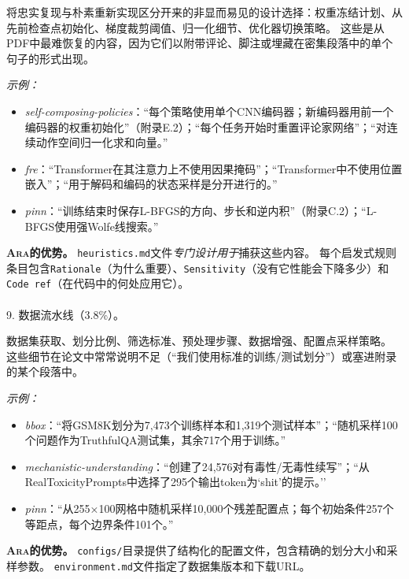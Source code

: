 \documentclass[
]{article}
\makeatletter
\let\oldparagraph\paragraph
\renewcommand{\paragraph}{
    \@ifstar
      \xxxParagraphStar
      \xxxParagraphNoStar
  }
\newcommand{\xxxParagraphStar}[1]{\oldparagraph*{#1}\mbox{}}
\newcommand{\xxxParagraphNoStar}[1]{\oldparagraph{#1}\mbox{}}
\newcommand{\passthrough}[1]{#1}
\providecommand{\tightlist}{%
  \setlength{\itemsep}{0pt}\setlength{\parskip}{0pt}}
\theoremstyle{definition}
\newcommand{\ara}{\textsc{Ara}}
\makeatother
\begin{document}
将忠实复现与朴素重新实现区分开来的非显而易见的设计选择：权重冻结计划、从先前检查点初始化、梯度裁剪阈值、归一化细节、优化器切换策略。
这些是从PDF中最难恢复的内容，因为它们以附带评论、脚注或埋藏在密集段落中的单个句子的形式出现。

\emph{示例：}

\begin{itemize}
\tightlist
\item
  \emph{self-composing-policies}：``每个策略使用单个CNN编码器；新编码器用前一个编码器的权重初始化''（附录E.2）；``每个任务开始时重置评论家网络''；``对连续动作空间归一化求和向量。''
\item
  \emph{fre}：``Transformer在其注意力上不使用因果掩码''；``Transformer中不使用位置嵌入''；``用于解码和编码的状态采样是分开进行的。''
\item
  \emph{pinn}：``训练结束时保存L-BFGS的方向、步长和逆内积''（附录C.2）；``L-BFGS使用强Wolfe线搜索。''
\end{itemize}

\textbf{\ara{}的优势。}
\passthrough{\lstinline!heuristics.md!}文件\emph{专门设计用于}捕获这些内容。
每个启发式规则条目包含\passthrough{\lstinline!Rationale!}（为什么重要）、\passthrough{\lstinline!Sensitivity!}（没有它性能会下降多少）和\passthrough{\lstinline!Code ref!}（在代码中的何处应用它）。

\paragraph{9.
数据流水线（3.8\%）。}\label{ux6570ux636eux6d41ux6c34ux7ebf3.8}

数据集获取、划分比例、筛选标准、预处理步骤、数据增强、配置点采样策略。
这些细节在论文中常常说明不足（``我们使用标准的训练/测试划分''）或塞进附录的某个段落中。

\emph{示例：}

\begin{itemize}
\tightlist
\item
  \emph{bbox}：``将GSM8K划分为7,473个训练样本和1,319个测试样本''；``随机采样100个问题作为TruthfulQA测试集，其余717个用于训练。''
\item
  \emph{mechanistic-understanding}：``创建了24,576对有毒性/无毒性续写''；``从RealToxicityPrompts中选择了295个输出token为`shit'的提示。''
\item
  \emph{pinn}：``从255×100网格中随机采样10,000个残差配置点；每个初始条件257个等距点，每个边界条件101个。''
\end{itemize}

\textbf{\ara{}的优势。}
\passthrough{\lstinline!configs/!}目录提供了结构化的配置文件，包含精确的划分大小和采样参数。
\passthrough{\lstinline!environment.md!}文件指定了数据集版本和下载URL。
\end{document}
